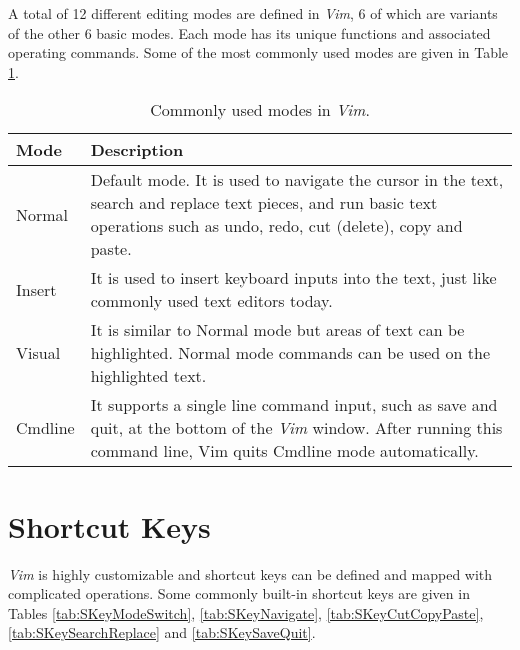 \documentclass[a4paper]{article}
\begin{document}
A total of 12 different editing modes are defined in \textit{Vim}, 6 of which are variants of the other 6 basic modes. Each mode has its unique functions and associated operating commands. Some of the most commonly used modes are given in Table \ref{tab:Modes}.
\begin{table}
  \centering \caption{Commonly used modes in \textit{Vim}.}\label{tab:Modes}
  \begin{tabularx}{\textwidth}{lX}
    \hline
    Mode & Description \\ \hline
    Normal & Default mode. It is used to navigate the cursor in the text, search and replace text pieces, and run basic text operations such as undo, redo, cut (delete), copy and paste. \\ \hdashline
    Insert & It is used to insert keyboard inputs into the text, just like commonly used text editors today. \\ \hdashline
    Visual & It is similar to Normal mode but areas of text can be highlighted. Normal mode commands can be used on the highlighted text. \\ \hdashline
    Cmdline & It supports a single line command input, such as save and quit, at the bottom of the \textit{Vim} window. After running this command line, Vim quits Cmdline mode automatically. \\
    \hline
  \end{tabularx}
\end{table}


\section{Shortcut Keys}

\textit{Vim} is highly customizable and shortcut keys can be defined and mapped with complicated operations. Some commonly built-in shortcut keys are given in Tables \ref{tab:SKeyModeSwitch}, \ref{tab:SKeyNavigate}, \ref{tab:SKeyCutCopyPaste}, \ref{tab:SKeySearchReplace} and \ref{tab:SKeySaveQuit}.
\end{document}
